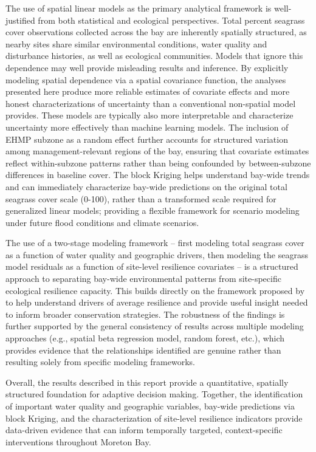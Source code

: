\documentclass[
  letterpaper,
  DIV=11,
  numbers=noendperiod]{scrartcl}
\begin{document}
The use of spatial linear models as the primary analytical framework is
well-justified from both statistical and ecological perspectives. Total
percent seagrass cover observations collected across the bay are
inherently spatially structured, as nearby sites share similar
environmental conditions, water quality and disturbance histories, as
well as ecological communities. Models that ignore this dependence may
well provide misleading results and inference. By explicitly modeling
spatial dependence via a spatial covariance function, the analyses
presented here produce more reliable estimates of covariate effects and
more honest characterizations of uncertainty than a conventional
non-spatial model provides. These models are typically also more
interpretable and characterize uncertainty more effectively than machine
learning models. The inclusion of EHMP subzone as a random effect
further accounts for structured variation among management-relevant
regions of the bay, ensuring that covariate estimates reflect
within-subzone patterns rather than being confounded by between-subzone
differences in baseline cover. The block Kriging helps understand
bay-wide trends and can immediately characterize bay-wide predictions on
the original total seagrass cover scale (0-100), rather than a
transformed scale required for generalized linear models; providing a
flexible framework for scenario modeling under future flood conditions
and climate scenarios.

The use of a two-stage modeling framework -- first modeling total
seagrass cover as a function of water quality and geographic drivers,
then modeling the seagrass model residuals as a function of site-level
resilience covariates -- is a structured approach to separating bay-wide
environmental patterns from site-specific ecological resilience
capacity. This builds directly on the framework proposed by
\citet{gilby2023drivers} to help understand drivers of average
resilience and provide useful insight needed to inform broader
conservation strategies. The robustness of the findings is further
supported by the general consistency of results across multiple modeling
approaches (e.g., spatial beta regression model, random forest, etc.),
which provides evidence that the relationships identified are genuine
rather than resulting solely from specific modeling frameworks.

Overall, the results described in this report provide a quantitative,
spatially structured foundation for adaptive decision making. Together,
the identification of important water quality and geographic variables,
bay-wide predictions via block Kriging, and the characterization of
site-level resilience indicators provide data-driven evidence that can
inform temporally targeted, context-specific interventions throughout
Moreton Bay.
\end{document}
